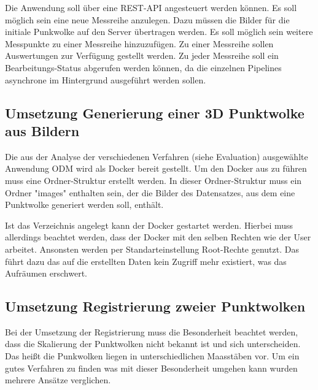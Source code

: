 \documentclass[12pt,titlepage, twoside]{article}
\begin{document}
Die Anwendung soll über eine REST-API angesteuert werden können. Es soll möglich sein eine neue Messreihe anzulegen. Dazu müssen die Bilder für die initiale Punkwolke auf den Server übertragen werden. 
Es soll möglich sein weitere Messpunkte zu einer Messreihe hinzuzufügen. Zu einer Messreihe sollen Auswertungen zur Verfügung gestellt werden. 
Zu jeder Messreihe soll ein Bearbeitungs-Status abgerufen werden können, da die einzelnen Pipelines asynchrone im Hintergrund ausgeführt werden sollen. 

\subsection{Umsetzung Generierung einer 3D Punktwolke aus Bildern}
\label{sec:realisierung:implementierung1}

Die aus der Analyse der verschiedenen Verfahren (siehe Evaluation) ausgewählte Anwendung ODM wird als Docker bereit gestellt. Um den Docker aus zu führen muss eine Ordner-Struktur erstellt werden.
In dieser Ordner-Struktur muss ein Ordner "images" enthalten sein, der die Bilder des Datensatzes, aus dem eine Punktwolke generiert werden soll, enthält.

Ist das Verzeichnis angelegt kann der Docker gestartet werden. Hierbei muss allerdings beachtet werden, dass der Docker mit den selben Rechten wie der User arbeitet. Ansonsten werden per Standarteinstellung Root-Rechte genutzt.
Das führt dazu das auf die erstellten Daten kein Zugriff mehr existiert, was das Aufräumen erschwert.

\subsection{Umsetzung Registrierung zweier Punktwolken}
\label{sec:realisierung:implementierung2}

Bei der Umsetzung der Registrierung muss die Besonderheit beachtet werden, dass die Skalierung der Punktwolken nicht bekannt ist und sich unterscheiden. Das heißt die Punkwolken liegen in unterschiedlichen Maasstäben vor.  
Um ein gutes Verfahren zu finden was mit dieser Besonderheit umgehen kann wurden mehrere Ansätze verglichen.
\end{document}
